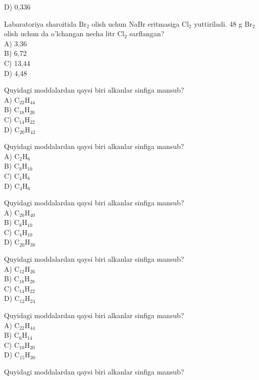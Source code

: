 D) 0,336
  \item Labaratoriya sharoitida $\mathrm{Br}_{2}$ olish uchun NaBr eritmasiga $\mathrm{Cl}_{2}$ yuttiriladi. 48 g $\mathrm{Br}_{2}$ olish uchun da o'lchangan necha litr $\mathrm{Cl}_{2}$ sarflangan?\\
A) 3,36\\
B) 6,72\\
C) 13,44\\
D) 4,48
  \item Quyidagi moddalardan qaysi biri alkanlar sinfiga mansub?\\
A) $\mathrm{C}_{22} \mathrm{H}_{44}$\\
B) $\mathrm{C}_{18} \mathrm{H}_{20}$\\
C) $\mathrm{C}_{14} \mathrm{H}_{22}$\\
D) $\mathrm{C}_{20} \mathrm{H}_{42}$\\
  \item Quyidagi moddalardan qaysi biri alkanlar sinfiga mansub?\\
A) $\mathrm{C}_{2} \mathrm{H}_{6}$\\
B) $\mathrm{C}_{8} \mathrm{H}_{10}$\\
C) $\mathrm{C}_{4} \mathrm{H}_{8}$\\
D) $\mathrm{C}_{4} \mathrm{H}_{6}$
  \item Quyidagi moddalardan qaysi biri alkanlar sinfiga mansub?\\
A) $\mathrm{C}_{20} \mathrm{H}_{40}$\\
B) $\mathrm{C}_{8} \mathrm{H}_{10}$\\
C) $\mathrm{C}_{4} \mathrm{H}_{10}$\\
D) $\mathrm{C}_{20} \mathrm{H}_{38}$
  \item Quyidagi moddalardan qaysi biri alkanlar sinfiga mansub?\\
A) $\mathrm{C}_{12} \mathrm{H}_{26}$\\
B) $\mathrm{C}_{18} \mathrm{H}_{28}$\\
C) $\mathrm{C}_{14} \mathrm{H}_{22}$\\
D) $\mathrm{C}_{12} \mathrm{H}_{24}$
  \item Quyidagi moddalardan qaysi biri alkanlar sinfiga mansub?\\
A) $\mathrm{C}_{22} \mathrm{H}_{44}$\\
B) $\mathrm{C}_{6} \mathrm{H}_{14}$\\
C) $\mathrm{C}_{10} \mathrm{H}_{20}$\\
D) $\mathrm{C}_{15} \mathrm{H}_{30}$
  \item Quyidagi moddalardan qaysi biri alkanlar sinfiga mansub?\\
